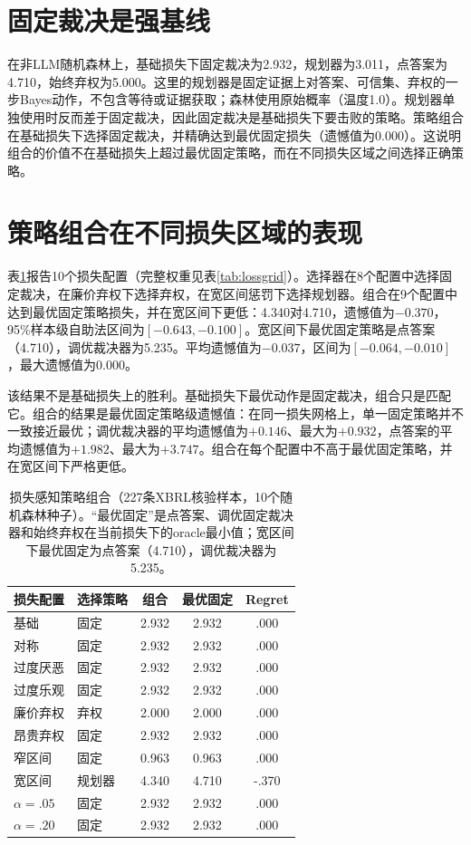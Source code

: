 \documentclass[12pt,openany]{ctexbook}
\begin{document}
\section{固定裁决是强基线}
在非LLM随机森林上，基础损失下固定裁决为2.932，规划器为3.011，点答案为4.710，始终弃权为5.000。这里的规划器是固定证据上对答案、可信集、弃权的一步Bayes动作，不包含等待或证据获取；森林使用原始概率（温度1.0）。规划器单独使用时反而差于固定裁决，因此固定裁决是基础损失下要击败的策略。策略组合在基础损失下选择固定裁决，并精确达到最优固定损失（遗憾值为0.000）。这说明组合的价值不在基础损失上超过最优固定策略，而在不同损失区域之间选择正确策略。\par

\section{策略组合在不同损失区域的表现}
表\ref{tab:portfolio}报告10个损失配置（完整权重见表\ref{tab:lossgrid}）。选择器在8个配置中选择固定裁决，在廉价弃权下选择弃权，在宽区间惩罚下选择规划器。组合在9个配置中达到最优固定策略损失，并在宽区间下更低：4.340对4.710，遗憾值为$-0.370$，95\%样本级自助法区间为$[-0.643,-0.100]$。宽区间下最优固定策略是点答案（4.710），调优裁决器为5.235。平均遗憾值为$-0.037$，区间为$[-0.064,-0.010]$，最大遗憾值为0.000。\par
该结果不是基础损失上的胜利。基础损失下最优动作是固定裁决，组合只是匹配它。组合的结果是最优固定策略级遗憾值：在同一损失网格上，单一固定策略并不一致接近最优；调优裁决器的平均遗憾值为$+0.146$、最大为$+0.932$，点答案的平均遗憾值为$+1.982$、最大为$+3.747$。组合在每个配置中不高于最优固定策略，并在宽区间下严格更低。\par
\begin{table}[htbp]
\centering
\caption{损失感知策略组合（227条XBRL核验样本，10个随机森林种子）。``最优固定''是点答案、调优固定裁决器和始终弃权在当前损失下的oracle最小值；宽区间下最优固定为点答案（4.710），调优裁决器为5.235。}
\label{tab:portfolio}
\begin{tabular}{llccc}
\toprule
损失配置 & 选择策略 & 组合 & 最优固定 & Regret \\
\midrule
基础 & 固定 & 2.932 & 2.932 & .000 \\
对称 & 固定 & 2.932 & 2.932 & .000 \\
过度厌恶 & 固定 & 2.932 & 2.932 & .000 \\
过度乐观 & 固定 & 2.932 & 2.932 & .000 \\
廉价弃权 & 弃权 & 2.000 & 2.000 & .000 \\
昂贵弃权 & 固定 & 2.932 & 2.932 & .000 \\
窄区间 & 固定 & 0.963 & 0.963 & .000 \\
宽区间 & 规划器 & 4.340 & 4.710 & -.370 \\
$\alpha=.05$ & 固定 & 2.932 & 2.932 & .000 \\
$\alpha=.20$ & 固定 & 2.932 & 2.932 & .000 \\
\bottomrule
\end{tabular}
\end{table}
\end{document}
